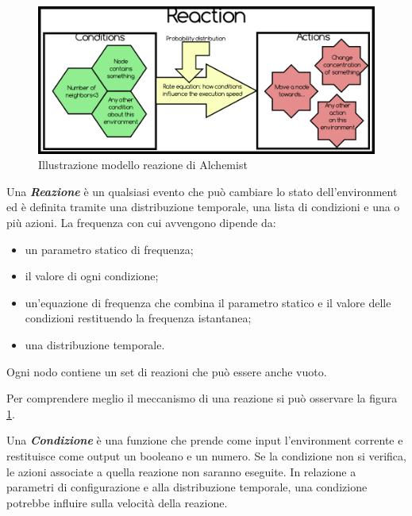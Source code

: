 \begin{figure} %
\begin{center} %
\includegraphics[width=14cm]{images/AlchemistReaction.png} %
\caption[Illustrazione modello reazione di Alchemist]{Illustrazione modello reazione di Alchemist} \label{fig:alchemistReaction}
\end{center}
\end{figure}

Una \textbf{\textit{Reazione}} è un qualsiasi evento che può cambiare lo stato dell'environment ed è definita tramite una distribuzione temporale, una lista di condizioni e una o più azioni.
La frequenza con cui avvengono dipende da:
\begin{itemize}
\item un parametro statico di frequenza;
\item il valore di ogni condizione;
\item un'equazione di frequenza che combina il parametro statico e il valore delle condizioni restituendo la frequenza istantanea;
\item una distribuzione temporale.
\end{itemize}
Ogni nodo contiene un set di reazioni che può essere anche vuoto.

Per comprendere meglio il meccanismo di una reazione si può osservare la figura \ref{fig:alchemistReaction}.

Una \textbf{\textit{Condizione}} è una funzione che prende come input l'environment corrente e restituisce come output un booleano e un numero. Se la condizione non si verifica, le azioni associate a quella reazione non saranno eseguite. In relazione a parametri di configurazione e alla distribuzione temporale, una condizione potrebbe influire sulla velocità della reazione.

